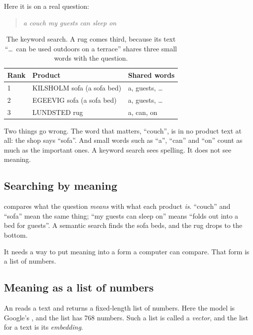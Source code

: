 \documentclass[11pt]{article}
\begin{document}
Here it is on a real question:
\begin{quote}\itshape
a couch my guests can sleep on
\end{quote}

\begin{table}[H]
\small
\begin{tabularx}{\textwidth}{@{}l X l@{}}
\toprule
Rank & Product & Shared words \\
\midrule
1 & KILSHOLM sofa (a sofa bed) & a, guests, \ldots \\
2 & EGEEVIG sofa (a sofa bed) & a, guests, \ldots \\
3 & \textcolor{accent}{LUNDSTED rug} & \textcolor{accent}{a, can, on} \\
\bottomrule
\end{tabularx}
\caption{The keyword search. A rug comes third, because its text
``\ldots\ can be used outdoors on a terrace'' shares three small words
with the question.}
\end{table}

Two things go wrong. The word that matters, ``couch'', is in no product
text at all: the shop says ``sofa''. And small words such as ``a'',
``can'' and ``on'' count as much as the important ones. A keyword
search sees spelling. It does not see meaning.

\subsection{Searching by meaning}

 compares what the
question \emph{means} with what each product \emph{is}. ``couch'' and
``sofa'' mean the same thing; ``my guests can sleep on'' means ``folds
out into a bed for guests''. A semantic search finds the sofa beds, and
the rug drops to the bottom.

It needs a way to put meaning into a form a computer can compare. That
form is a list of numbers.

\subsection{Meaning as a list of numbers}

An  reads a text and returns a fixed-length list of
numbers. Here the model is Google's , and
the list has 768 numbers. Such a list is called a \emph{vector}, and
the list for a text is its \emph{embedding}.
\end{document}
